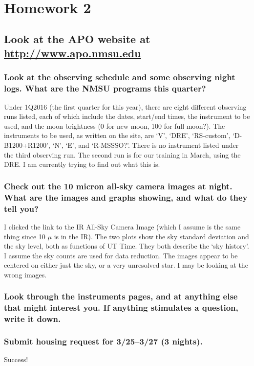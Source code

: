 \documentclass[12pt]{article}
\begin{document}
\section*{Homework 2}
\subsection*{Look at the APO website at
\textcolor{blue}{\url{http://www.apo.nmsu.edu}}}

\subsubsection*{Look at the observing schedule and some observing night logs.
    What are the NMSU programs this quarter?}

    Under 1Q2016 (the first quarter for this year), there are eight different
    observing runs listed, each of which include the dates, start/end times,
    the instrument to be used, and the moon brightness (0 for new moon,
    100 for full moon?).
    The instruments to be used, as written on the site, are
    `V', `DRE', `RS-custom', `D-B1200+R1200', `N', `E', and `R-MSSSO?'.
    There is no instrument listed under the third observing run.
    The second run is for our training in March, using the DRE\@.
    I am currently trying to find out what this is.

\subsubsection*{Check out the 10 micron all-sky camera images at night. What are
    the images and graphs showing, and what do they tell you?}

    I clicked the link to the IR All-Sky Camera Image (which I assume is the
    same thing since 10 $\mu$ is in the IR). The two plots show the sky
    standard deviation and the sky level, both as functions of UT Time.
    They both describe the `sky history'.
    I assume the sky counts are used for data reduction.
    The images appear to be centered on either just the sky, or a very
    unresolved star. I may be looking at the wrong images.

\subsubsection*{Look through the instruments pages, and at anything else that might
    interest you. If anything stimulates a question, write it down.}



\subsubsection*{Submit housing request for 3/25--3/27 (3 nights).}

    Success!
\end{document}
